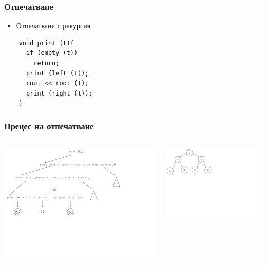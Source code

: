 \documentclass{beamer}
\begin{document}
\begin{frame}[fragile]
\frametitle{Отпечатване}

\begin{itemize}
  \item Отпечатване с рекурсия 
\end{itemize}

\begin{flushleft}
  \begin{lstlisting}
    void print (t){
      if (empty (t))
        return;
      print (left (t));
      cout << root (t);
      print (right (t));
    }
  \end{lstlisting}
\end{flushleft}

\end{frame}



\begin{frame}[fragile]
\frametitle{Прецес на отпечатване}



\begin{columns}[t]
  \begin{column}{0.65\textwidth}
\includegraphics[width=14cm]{images/tree_print_process}
  \end{column}
  \begin{column}{0.35\textwidth}
  \vspace{-160px}
\includegraphics[width=9cm]{images/tree_bot_clean}

  \end{column}
\end{columns}
\end{frame}
\end{document}
